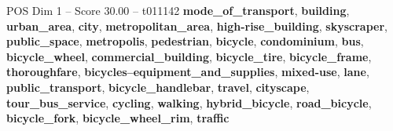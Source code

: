 \begin{textsample}{POS Dim 1 – Score 30.00 – t011142}  \label{ex:f1_pos_002}
\textbf{mode\_of\_transport}, \textbf{building}, \textbf{urban\_area}, \textbf{city}, \textbf{metropolitan\_area}, \textbf{high-rise\_building}, \textbf{skyscraper}, \textbf{public\_space}, \textbf{metropolis}, \textbf{pedestrian}, \textbf{bicycle}, \textbf{condominium}, \textbf{bus}, \textbf{bicycle\_wheel}, \textbf{commercial\_building}, \textbf{bicycle\_tire}, \textbf{bicycle\_frame}, \textbf{thoroughfare}, \textbf{bicycles--equipment\_and\_supplies}, \textbf{mixed-use}, \textbf{lane}, \textbf{public\_transport}, \textbf{bicycle\_handlebar}, \textbf{travel}, \textbf{cityscape}, \textbf{tour\_bus\_service}, \textbf{cycling}, \textbf{walking}, \textbf{hybrid\_bicycle}, \textbf{road\_bicycle}, \textbf{bicycle\_fork}, \textbf{bicycle\_wheel\_rim}, \textbf{traffic}

\end{textsample}
